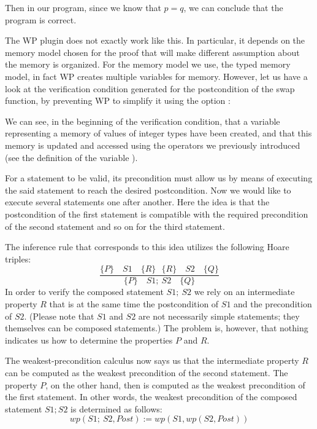 Then in our program, since we know that $p = q$, we can conclude that the program
is correct.


The WP plugin does not exactly work like this. In particular, it depends on the
memory model chosen for the proof that will make different assumption about the
memory is organized. For the memory model we use, the typed memory model, in
fact WP creates multiple variables for memory. However, let us have a look at
the verification condition generated for the postcondition of the swap function,
by preventing WP to simplify it using the option :




We can see, in the beginning of the verification condition, that a variable
 representing a memory of values of integer types have been
created, and that this memory is updated and accessed using the operators we
previously introduced (see the definition of the variable ).



For a statement to be valid, its precondition must allow us by means of
executing the said statement to reach the desired postcondition. Now we
would like to execute several statements one after another. Here the
idea is that the postcondition of the first statement is compatible with
the required precondition of the second statement and so on for the
third statement.



The inference rule that corresponds to this idea utilizes the following
Hoare triples:
$$\dfrac{\{P\}\quad S1 \quad \{R\} \ \ \ \{R\}\quad S2 \quad \{Q\}}{\{P\}\quad S1 ;\ S2 \quad \{Q\}}$$
In order to verify the composed statement $S1;\ S2$ we rely on an
intermediate property $R$ that is at the same time the postcondition
of $S1$ and the precondition of $S2$. (Please note that $S1$ and
$S2$ are not necessarily simple statements; they themselves can be
composed statements.) The problem is, however, that nothing indicates us
how to determine the properties $P$ and $R$.

The weakest-precondition calculus now says us that the intermediate
property $R$ can be computed as the weakest precondition of the second
statement. The property $P$, on the other hand, then is computed as
the weakest precondition of the first statement. In other words, the
weakest precondition of the composed statement $S1; S2$ is determined
as follows:
$$wp(S1;\ S2 , Post) := wp(S1, wp(S2, Post) )$$


